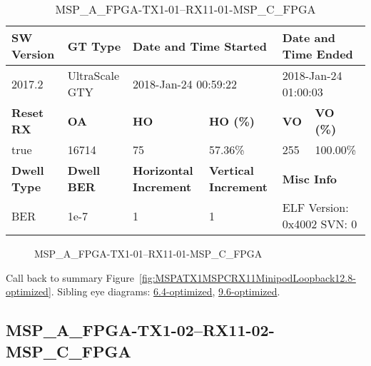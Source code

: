 \begin{table}[h]
\centering
\caption{MSP\_A\_FPGA-TX1-01--RX11-01-MSP\_C\_FPGA}
\label{tab:MSPAFPGATX101RX1101MSPCFPGA12.8-optimized}
\begin{tabular}{@{}|l|l|l|l|l|l|@{}}
\toprule
\textbf{SW Version}                & \textbf{GT Type}   & \multicolumn{2}{l|}{\textbf{Date and Time Started}}            & \multicolumn{2}{l|}{\textbf{Date and Time Ended}}        \\ \midrule
2017.2                       & UltraScale GTY          & \multicolumn{2}{l|}{2018-Jan-24 00:59:22}                   & \multicolumn{2}{l|}{2018-Jan-24 01:00:03}               \\ \midrule
\textbf{Reset RX}                  & \textbf{OA} & \textbf{HO}   & \textbf{HO (\%)} & \textbf{VO} & \textbf{VO (\%)} \\ \midrule
true & 16714        & 75          & 57.36\%        & 255        & 100.00\%       \\ \midrule
\textbf{Dwell Type}                & \textbf{Dwell BER} & \textbf{Horizontal Increment} & \textbf{Vertical Increment}    & \multicolumn{2}{l|}{\textbf{Misc Info}}                  \\ \midrule
BER                            & 1e-7        & 1        & 1           & \multicolumn{2}{l|}{ELF Version: 0x4002 SVN: 0}                         \\ \bottomrule
\end{tabular}
\end{table}

\begin{figure}[h]
\caption{MSP\_A\_FPGA-TX1-01--RX11-01-MSP\_C\_FPGA} \label{fig:MSPAFPGATX101RX1101MSPCFPGA12.8-optimized}
\end{figure}

Call back to summary Figure~\ref{fig:MSPATX1MSPCRX11MinipodLoopback12.8-optimized}.
Sibling eye diagrams: \hyperref[sec:MSPAFPGATX101RX1101MSPCFPGA6.4-optimized]{6.4-optimized}, \hyperref[sec:MSPAFPGATX101RX1101MSPCFPGA9.6-optimized]{9.6-optimized}.

\clearpage
\newpage


\subsection{MSP\_A\_FPGA-TX1-02--RX11-02-MSP\_C\_FPGA}\label{sec:MSPAFPGATX102RX1102MSPCFPGA12.8-optimized}

